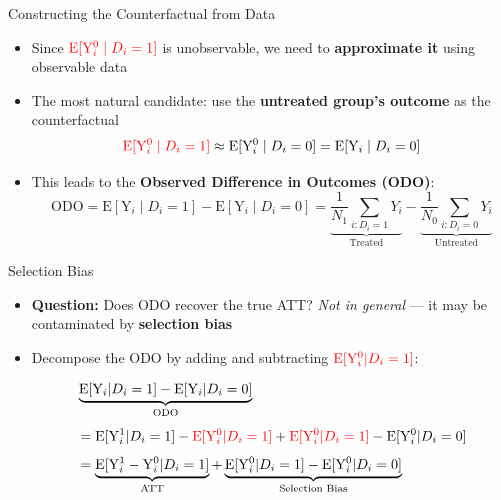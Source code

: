 \documentclass[hyperref={pdfpagelabels=false}]{beamer}
\begin{document}
\begin{frame}{Constructing the Counterfactual from Data}
	\begin{itemize}
		\item Since ${\color{red}\mathrm{E}[\mathrm{Y}^{0}_{i} \mid D_i=1]}$ is unobservable, we need to \textbf{approximate it} using observable data
		\vspace{0.2cm}
		\item The most natural candidate: use the \textbf{untreated group's outcome} as the counterfactual
		\begin{equation*}
			{\color{red}\mathrm{E}[\mathrm{Y}^{0}_{i} \mid D_i=1]} \approx \mathrm{E}[\mathrm{Y}^{0}_{i} \mid D_i=0] = \mathrm{E}[\mathrm{Y}_{i} \mid D_i=0]
		\end{equation*}
		\vspace{0.1cm}
		\item This leads to the \textbf{Observed Difference in Outcomes (ODO)}:
		\begin{equation*}
			\text{ODO} = \mathrm{E}[\mathrm{Y}_{i} \mid D_i=1] - \mathrm{E}[\mathrm{Y}_{i} \mid D_i=0]
			= \underbrace{\dfrac{1}{N_1} \sum_{i:D_i=1} Y_i}_{\text{Treated}} - \underbrace{\dfrac{1}{N_0} \sum_{i:D_i=0} Y_i}_{\text{Untreated}}
		\end{equation*}
		
	\end{itemize}
\end{frame}

\begin{frame}{Selection Bias}
	\begin{itemize}

        \item \textbf{Question:} Does ODO recover the true ATT? \emph{Not in general} --- it may be contaminated by \textbf{selection bias}
        		\vspace{0.2cm}

        
        \item Decompose the ODO by adding and subtracting ${\color{red}\mathrm{E}[\mathrm{Y}^{0}_{i}|D_i=1]}$:
                		\vspace{0.2cm}

	\begin{equation*}
		\begin{aligned}
			&\underbrace{\mathrm{E}[\mathrm{Y}_{i}|D_i=1] - \mathrm{E}[\mathrm{Y}_{i}|D_i=0]}_{\text{ODO}} \\[4pt]
			&= \mathrm{E}[\mathrm{Y}^{1}_{i}|D_i=1]-{\color{red}\mathrm{E}[\mathrm{Y}^{0}_{i}|D_i=1]}+{\color{red}\mathrm{E}[\mathrm{Y}^{0}_{i}|D_i=1]}-\mathrm{E}[\mathrm{Y}^{0}_{i}|D_i=0] \\[4pt]
			&= \underbrace{\mathrm{E}[\mathrm{Y}^{1}_{i}-\mathrm{Y}^{0}_{i}|D_i=1]}_{\text{ATT}} + \underbrace{\mathrm{E}[\mathrm{Y}^{0}_{i}|D_i=1]-\mathrm{E}[\mathrm{Y}^{0}_{i}|D_i=0]}_{\text{Selection Bias}}
		\end{aligned}
	\end{equation*}
	
	\end{itemize}
\end{frame}
\end{document}
